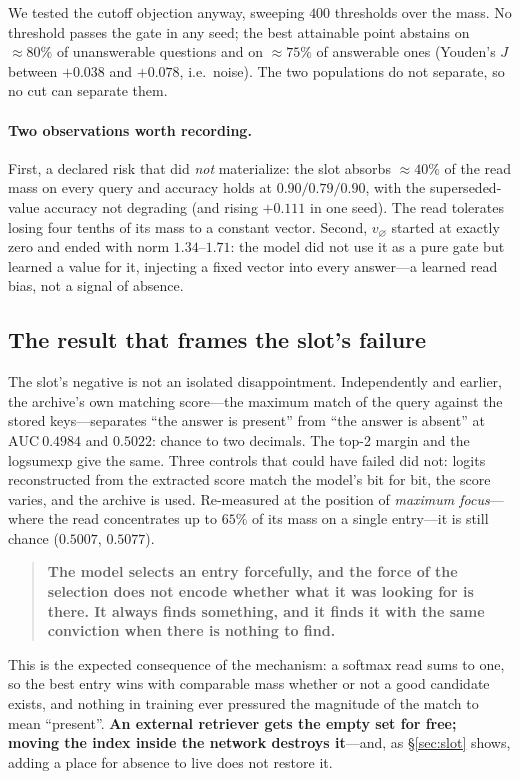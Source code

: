 \documentclass[11pt,a4paper]{article}
\begin{document}
We tested the cutoff objection anyway, sweeping $400$ thresholds over the mass. No threshold passes
the gate in any seed; the best attainable point abstains on $\approx 80\%$ of unanswerable questions
and on $\approx 75\%$ of answerable ones (Youden's $J$ between $+0.038$ and $+0.078$, i.e.\ noise).
The two populations do not separate, so no cut can separate them.

\paragraph{Two observations worth recording.} First, a declared risk that did \emph{not}
materialize: the slot absorbs $\approx 40\%$ of the read mass on every query and accuracy holds at
$0.90 / 0.79 / 0.90$, with the superseded-value accuracy not degrading (and rising $+0.111$ in one
seed). The read tolerates losing four tenths of its mass to a constant vector. Second,
$v_{\varnothing}$ started at exactly zero and ended with norm $1.34$--$1.71$: the model did not use
it as a pure gate but learned a value for it, injecting a fixed vector into every answer---a learned
read bias, not a signal of absence.

\subsection{The result that frames the slot's failure}

The slot's negative is not an isolated disappointment. Independently and earlier, the archive's own
matching score---the maximum match of the query against the stored keys---separates ``the answer is
present'' from ``the answer is absent'' at $\mathrm{AUC}\ 0.4984$ and $0.5022$: chance to two
decimals. The top-2 margin and the logsumexp give the same. Three controls that could have failed
did not: logits reconstructed from the extracted score match the model's bit for bit, the score
varies, and the archive is used. Re-measured at the position of \emph{maximum focus}---where the
read concentrates up to $65\%$ of its mass on a single entry---it is still chance
($0.5007$, $0.5077$).

\begin{quote}
\textbf{The model selects an entry forcefully, and the force of the selection does not encode
whether what it was looking for is there. It always finds something, and it finds it with the same
conviction when there is nothing to find.}
\end{quote}

This is the expected consequence of the mechanism: a softmax read sums to one, so the best entry
wins with comparable mass whether or not a good candidate exists, and nothing in training ever
pressured the magnitude of the match to mean ``present''. \textbf{An external retriever gets the
empty set for free; moving the index inside the network destroys it}---and, as \S\ref{sec:slot}
shows, adding a place for absence to live does not restore it.
\end{document}

